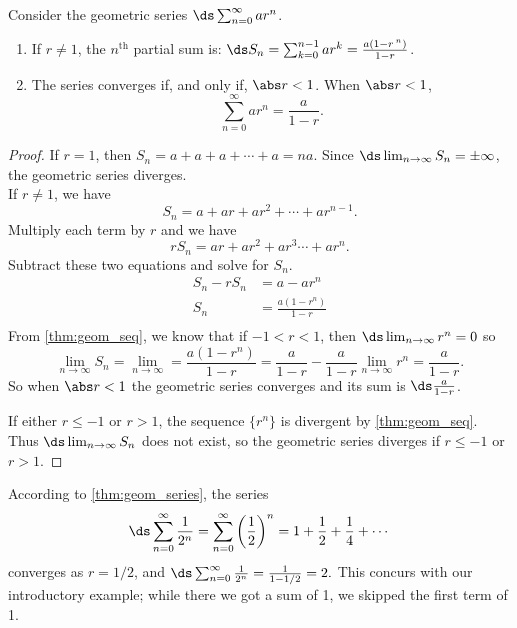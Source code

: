 {Consider the geometric series $\ds \sum_{n=0}^\infty ar^n$.
\begin{enumerate}
\item	If $r\neq1$, the $n^\text{th}$ partial sum is: $\ds S_n = \sum_{k=0}^{n-1}ar^k=\frac{a(1-r\,^n)}{1-r}$.
\item	The series converges if, and only if, $\abs r<1$. When $\abs r<1$, 
\[\sum_{n=0}^\infty ar^n = \frac{a}{1-r}.\]
\end{enumerate}}

\begin{proof}
If $r=1$, then $S_n=a+a+a+\dotsb+a=na$. Since $\ds\lim_{n\to \infty} S_n=\pm \infty$, the geometric series diverges.\\
If $r\neq 1$, we have
\[S_n=a+ar+ar^2+\dotsb+ar^{n-1}.\]
Multiply each term by $r$ and we have 
\[rS_n=ar+ar^2+ar^3\dotsb+ar^n.\]
Subtract these two equations and solve for $S_n$.
\begin{align*}
S_n-rS_n &=a-ar^n \\
S_n &=\frac{a(1-r^n)}{1-r}\\
\end{align*}
From \autoref{thm:geom_seq}, we know that if $-1<r<1$, then $\ds \lim_{n\to \infty} r^n=0$ so
\[
\lim_{n\to \infty} S_n=\lim_{n\to \infty}=\frac{a(1-r^n)}{1-r}
=\frac{a}{1-r}- \frac{a}{1-r}\lim_{n\to \infty}r^n=\frac{a}{1-r}.
\]
So when $\abs r<1$ the geometric series converges and its sum is $\ds \frac{a}{1-r}$.

If either $r\leq -1$ or $r>1$, the sequence $\{r^n\}$ is divergent by \autoref{thm:geom_seq}. Thus $\ds \lim_{n\to \infty} S_n$ does not exist, so the geometric series diverges if $r\leq -1$ or $r>1$.
\end{proof}

According to \autoref{thm:geom_series}, the series 
\[
\ds\sum_{n=0}^\infty \frac{1}{2^n}
=\sum_{n=0}^\infty \left(\frac 12\right)^n= 1+\frac12+\frac14+\dotsb
\]
converges as $r=1/2$, and $\ds \sum_{n=0}^\infty \frac{1}{2^n} = \frac{1}{1-1/2} = 2.$ This concurs with our introductory example; while there we got a sum of 1, we skipped the first term of 1.\\

